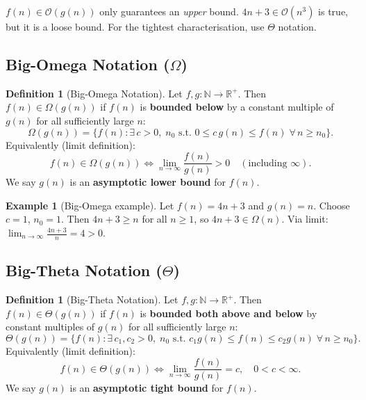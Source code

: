 \documentclass[11pt, a4paper, notitlepage]{report}
\theoremstyle{definition}
\newtheorem{definition}[theorem]{Definition}
\theoremstyle{remark}
\theoremstyle{definition}
\newtheorem{example}[theorem]{Example}
\begin{document}
\begin{warning}[title={Warning: Big-Oh does not mean ``tight''}]
$f(n) \in \mathcal{O}(g(n))$ only guarantees an \emph{upper} bound.
$4n+3 \in \mathcal{O}(n^3)$ is true, but it is a loose bound.
For the tightest characterisation, use $\Theta$ notation.
\end{warning}

\subsection{Big-Omega Notation (\texorpdfstring{$\Omega$}{Omega})}
\label{subsec:big-omega}

\begin{definition}[Big-Omega Notation]
\label{def:big-omega}
Let $f, g : \mathbb{N} \to \mathbb{R}^+$.  Then $f(n) \in \Omega(g(n))$
if $f(n)$ is \textbf{bounded below} by a constant multiple of $g(n)$ for all
sufficiently large $n$:
\[
  \Omega(g(n)) = \bigl\{f(n) : \exists\, c > 0,\; n_0 \text{ s.t.\ }
  0 \le c\,g(n) \le f(n)\; \forall\, n \ge n_0\bigr\}.
\]
Equivalently (limit definition):
\[
  f(n) \in \Omega(g(n)) \iff \lim_{n\to\infty}\frac{f(n)}{g(n)} > 0
  \quad (\text{including } \infty).
\]
We say $g(n)$ is an \textbf{asymptotic lower bound} for $f(n)$.
\end{definition}

\begin{example}[Big-Omega example]
\label{ex:big-omega-example}
Let $f(n) = 4n + 3$ and $g(n) = n$.  Choose $c = 1$, $n_0 = 1$.
Then $4n + 3 \ge n$ for all $n \ge 1$, so $4n+3 \in \Omega(n)$.
Via limit: $\lim_{n\to\infty}\frac{4n+3}{n} = 4 > 0$. \checkmark
\end{example}

\subsection{Big-Theta Notation (\texorpdfstring{$\Theta$}{Theta})}
\label{subsec:big-theta}

\begin{definition}[Big-Theta Notation]
\label{def:big-theta}
Let $f, g : \mathbb{N} \to \mathbb{R}^+$.  Then $f(n) \in \Theta(g(n))$
if $f(n)$ is \textbf{bounded both above and below} by constant multiples
of $g(n)$ for all sufficiently large $n$:
\[
  \Theta(g(n)) = \bigl\{f(n) : \exists\, c_1, c_2 > 0,\; n_0 \text{ s.t.\ }
  c_1 g(n) \le f(n) \le c_2 g(n)\; \forall\, n \ge n_0\bigr\}.
\]
Equivalently (limit definition):
\[
  f(n) \in \Theta(g(n)) \iff \lim_{n\to\infty}\frac{f(n)}{g(n)} = c,
  \quad 0 < c < \infty.
\]
We say $g(n)$ is an \textbf{asymptotic tight bound} for $f(n)$.
\end{definition}
\end{document}

